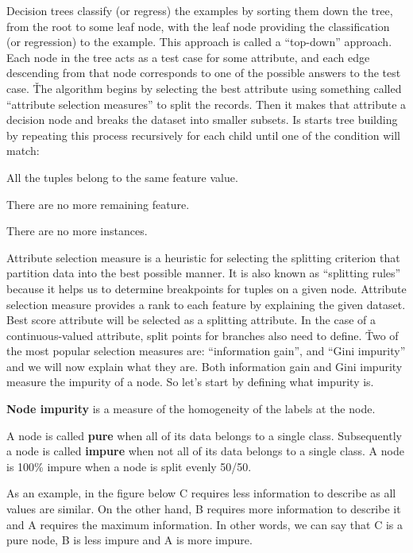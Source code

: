 
Decision trees classify (or regress) the examples by sorting them down the tree, from the root to some leaf node,
with the leaf node providing the classification (or regression) to the example. This approach is called a
``top-down'' approach. Each node in the tree acts as a test case for some attribute, and each edge descending from
that node corresponds to one of the possible answers to the test case. \v

The algorithm begins by selecting the best attribute using something called ``attribute selection measures'' to
split the records. Then it makes that attribute a decision node and breaks the dataset into smaller subsets. Is
starts tree building by repeating this process recursively for each child until one of the condition will match:
\bit
\item All the tuples belong to the same feature value.
\item There are no more remaining feature.
\item There are no more instances.
\eit

Attribute selection measure is a heuristic for selecting the splitting criterion that partition data into the best
possible manner. It is also known as ``splitting rules'' because it helps us to determine breakpoints for tuples on
a given node. Attribute selection measure provides a rank to each feature by explaining the given dataset. Best score
attribute will be selected as a splitting attribute. In the case of a continuous-valued attribute, split points for
branches also need to define. \v

Two of the most popular selection measures are: ``information gain'', and ``Gini impurity'' and we will now
explain what they are. Both information gain and Gini impurity measure the impurity of a node. So let's start by
defining what impurity is.

\textbf{Node impurity} is a measure of the homogeneity of the labels at the node.
\ed

A node is called \textbf{pure} when all of its data belongs to a single class. Subsequently a node is called
\textbf{impure} when not all of its data belongs to a single class. A node is 100\% impure when a node is split
evenly 50/50.
\ed

\be
As an example, in the figure below C requires less information to describe as all values are similar. On the other
hand, B requires more information to describe it and A requires the maximum information. In other words, we can say
that C is a pure node, B is less impure and A is more impure.

